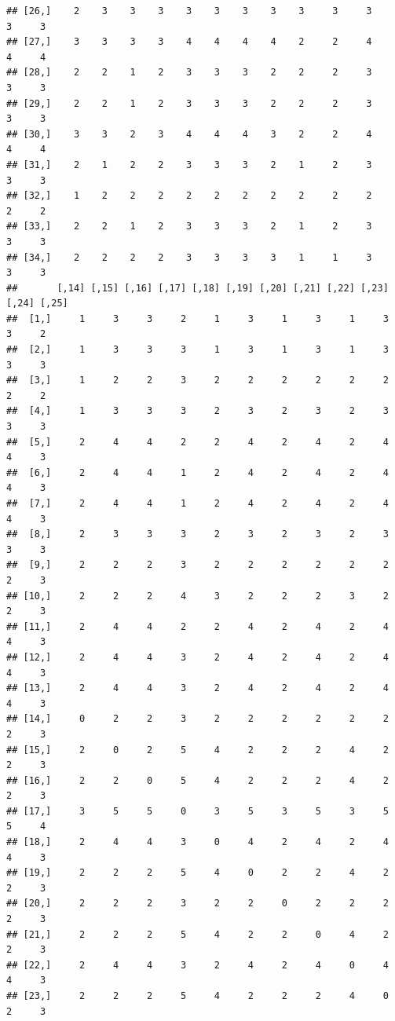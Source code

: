 \documentclass[
]{article}
\begin{document}
\begin{verbatim}
## [26,]    2    3    3    3    3    3    3    3    3     3     3     3     3
## [27,]    3    3    3    3    4    4    4    4    2     2     4     4     4
## [28,]    2    2    1    2    3    3    3    2    2     2     3     3     3
## [29,]    2    2    1    2    3    3    3    2    2     2     3     3     3
## [30,]    3    3    2    3    4    4    4    3    2     2     4     4     4
## [31,]    2    1    2    2    3    3    3    2    1     2     3     3     3
## [32,]    1    2    2    2    2    2    2    2    2     2     2     2     2
## [33,]    2    2    1    2    3    3    3    2    1     2     3     3     3
## [34,]    2    2    2    2    3    3    3    3    1     1     3     3     3
##       [,14] [,15] [,16] [,17] [,18] [,19] [,20] [,21] [,22] [,23] [,24] [,25]
##  [1,]     1     3     3     2     1     3     1     3     1     3     3     2
##  [2,]     1     3     3     3     1     3     1     3     1     3     3     3
##  [3,]     1     2     2     3     2     2     2     2     2     2     2     2
##  [4,]     1     3     3     3     2     3     2     3     2     3     3     3
##  [5,]     2     4     4     2     2     4     2     4     2     4     4     3
##  [6,]     2     4     4     1     2     4     2     4     2     4     4     3
##  [7,]     2     4     4     1     2     4     2     4     2     4     4     3
##  [8,]     2     3     3     3     2     3     2     3     2     3     3     3
##  [9,]     2     2     2     3     2     2     2     2     2     2     2     3
## [10,]     2     2     2     4     3     2     2     2     3     2     2     3
## [11,]     2     4     4     2     2     4     2     4     2     4     4     3
## [12,]     2     4     4     3     2     4     2     4     2     4     4     3
## [13,]     2     4     4     3     2     4     2     4     2     4     4     3
## [14,]     0     2     2     3     2     2     2     2     2     2     2     3
## [15,]     2     0     2     5     4     2     2     2     4     2     2     3
## [16,]     2     2     0     5     4     2     2     2     4     2     2     3
## [17,]     3     5     5     0     3     5     3     5     3     5     5     4
## [18,]     2     4     4     3     0     4     2     4     2     4     4     3
## [19,]     2     2     2     5     4     0     2     2     4     2     2     3
## [20,]     2     2     2     3     2     2     0     2     2     2     2     3
## [21,]     2     2     2     5     4     2     2     0     4     2     2     3
## [22,]     2     4     4     3     2     4     2     4     0     4     4     3
## [23,]     2     2     2     5     4     2     2     2     4     0     2     3

\end{verbatim}
\end{document}
